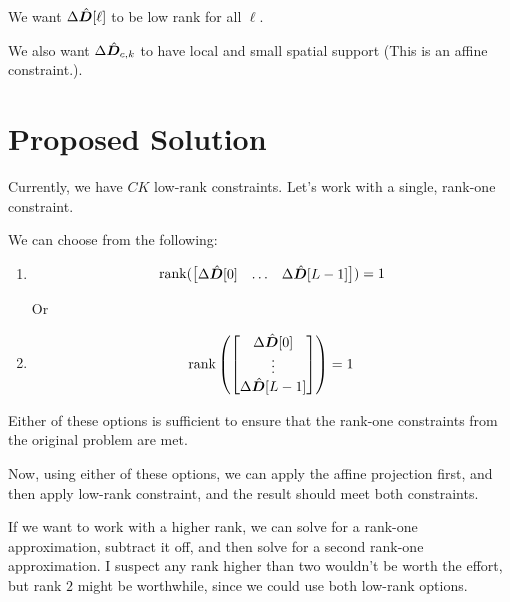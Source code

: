 \documentclass{article}
\begin{document}
We want $\Delta \hat{\bm{D}}[\ell]$ to be low rank for all $\ell$.

We also want $\Delta \hat{\bm{D}}_{c,k}$ to have local and small spatial support (This is an affine constraint.).

\section{Proposed Solution}

Currently, we have $CK$ low-rank constraints. Let's work with a single, rank-one constraint.

We can choose from the following:

\begin{enumerate}

\item
\begin{equation}
\begin{matrix}
\operatorname{rank}(\begin{bmatrix} \Delta \hat{\bm{D}}[0] & \hdots & \Delta \hat{\bm{D}}[L - 1] \end{bmatrix}) = 1
\end{matrix}
\end{equation}

Or
\item
\begin{equation}
\begin{matrix}
\operatorname{rank} \left (\begin{bmatrix} \Delta \hat{\bm{D}}[0] \\
                                    \vdots \\
                                    \Delta \hat{\bm{D}}[L - 1] \end{bmatrix} \right ) = 1
\end{matrix}
\end{equation}

\end{enumerate}

Either of these options is sufficient to ensure that the rank-one constraints from the original problem are met.

Now, using either of these options, we can apply the affine projection first, and then apply low-rank constraint, and the result should meet both constraints.

If we want to work with a higher rank, we can solve for a rank-one approximation, subtract it off, and then solve for a second rank-one approximation. I suspect any rank higher than two wouldn't be worth the effort, but rank $2$ might be worthwhile, since we could use both low-rank options.
\end{document}
